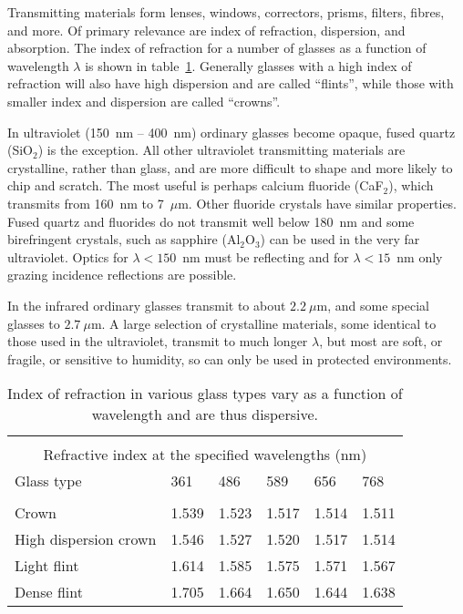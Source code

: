 \documentclass{article}
\begin{document}
Transmitting materials form lenses, windows, correctors, prisms, filters, fibres, and more. Of
primary relevance are index of refraction, dispersion, and absorption. The index of refraction for
a number of glasses as a function of wavelength $\lambda$ is shown in table~\ref{tab:glass-refraction}. Generally glasses with a high index of refraction will also have high dispersion and are called ``flints'', while those with smaller index and dispersion are 
called ``crowns''. 

In ultraviolet (150~nm -- 400~nm) ordinary glasses become opaque, fused quartz (SiO$_2$) is
the exception. All other ultraviolet transmitting materials are crystalline, rather than glass, and
are more difficult to shape and more likely to chip and scratch. The most useful is perhaps
calcium fluoride (CaF$_2$), which transmits from 160~nm to 7~$\mu$m. Other fluoride crystals
have similar properties. Fused quartz and fluorides do not transmit well below 180~nm and some
birefringent crystals, such as sapphire (Al$_2$O$_3$) can be used in the very far ultraviolet.
Optics for $\lambda < 150$~nm must be reflecting and for $\lambda < 15$~nm only grazing
incidence reflections are possible.

In the infrared ordinary glasses transmit to about $2.2~\mu$m, and some special glasses to 
$2.7~\mu$m. A large selection of crystalline materials, some identical to those used in the
ultraviolet, transmit to much longer $\lambda$, but most are soft, or fragile, or sensitive to
humidity, so can only be used in protected environments.

\begin{table}
\begin{tabular}{llllll}
\hline\hline
& & & & & \\
\multicolumn{6}{c}{Refractive index at the specified wavelengths (nm)} \\
Glass type & 361 & 486 & 589 & 656 & 768  \\
\hline
& & & & & \\
Crown & 1.539 & 1.523 & 1.517 & 1.514 & 1.511 \\
High dispersion crown & 1.546 & 1.527 & 1.520 & 1.517 & 1.514 \\
Light flint & 1.614 & 1.585 & 1.575 & 1.571 & 1.567 \\
Dense flint & 1.705 & 1.664 & 1.650 & 1.644 & 1.638 \\
\hline
\end{tabular}
\caption{Index of refraction in various glass types vary as a function
of wavelength and are thus dispersive.}
\label{tab:glass-refraction}
\end{table}
\end{document}
